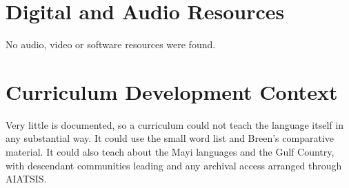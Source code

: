 \documentclass[12pt]{article}
\begin{document}
\section{Digital and Audio Resources}
No audio, video or software resources were found.

\section{Curriculum Development Context}
Very little is documented, so a curriculum could not teach the language itself in any substantial way. It could use the small word list and Breen's comparative material. It could also teach about the Mayi languages and the Gulf Country, with descendant communities leading and any archival access arranged through AIATSIS.
\end{document}
